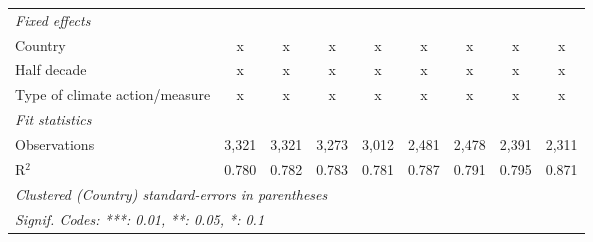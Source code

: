\begin{table}[htbp]
\begin{tabular}{lcccccccc}
      \emph{Fixed effects}\\
      Country                                                             & x            & x            & x            & x       & x            & x             & x             & x\\  
      Half decade                                                         & x            & x            & x            & x       & x            & x             & x             & x\\  
      Type of climate action/measure                                      & x            & x            & x            & x       & x            & x             & x             & x\\  
      \midrule \emph{Fit statistics}\\
      Observations                                                        & 3,321        & 3,321        & 3,273        & 3,012   & 2,481        & 2,478         & 2,391         & 2,311\\  
      R$^2$                                                               & 0.780        & 0.782        & 0.783        & 0.781   & 0.787        & 0.791         & 0.795         & 0.871\\  
      \midrule
      \multicolumn{9}{l}{\emph{Clustered (Country) standard-errors in parentheses}}\\
      \multicolumn{9}{l}{\emph{Signif. Codes: ***: 0.01, **: 0.05, *: 0.1}}\\
   \end{tabular}
\end{table}


